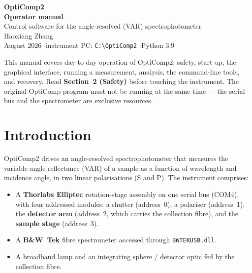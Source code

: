 \documentclass[11pt]{article}
\newcommand{\code}[1]{\texttt{\small #1}}
\begin{document}
\thispagestyle{empty}
\vspace*{2.4cm}
\begin{center}
{\Huge\bfseries\color{accent} OptiComp2}\\[8pt]
{\LARGE\bfseries Operator manual}\\[18pt]
{\large Control software for the angle-resolved (VAR) spectrophotometer}\\[28pt]
{\large Haoxiang Zhang}\\[6pt]
{\normalsize August 2026 \quad$\cdot$\quad instrument PC: \code{C:\textbackslash OptiComp2} \quad$\cdot$\quad Python 3.9}
\end{center}
\vfill
\begin{notebox}
\small This manual covers day-to-day operation of OptiComp2: safety, start-up, the graphical
interface, running a measurement, analysis, the command-line tools, and recovery. Read
\textbf{Section~2 (Safety)} before touching the instrument. The original OptiComp program must not be
running at the same time --- the serial bus and the spectrometer are exclusive resources.
\end{notebox}
\newpage

\tableofcontents
\newpage

\section{Introduction}

OptiComp2 drives an angle-resolved spectrophotometer that measures the variable-angle reflectance
(VAR) of a sample as a function of wavelength and incidence angle, in two linear polarisations (S and
P). The instrument comprises:

\begin{itemize}
\item A \textbf{Thorlabs Elliptec} rotation-stage assembly on one serial bus (COM4), with four
addressed modules: a shutter (address~0), a polariser (address~1), the \textbf{detector arm}
(address~2, which carries the collection fibre), and the \textbf{sample stage} (address~3).
\item A \textbf{B\&W~Tek} fibre spectrometer accessed through \code{BWTEKUSB.dll}.
\item A broadband lamp and an integrating sphere / detector optic fed by the collection fibre.
\end{itemize}
\end{document}
